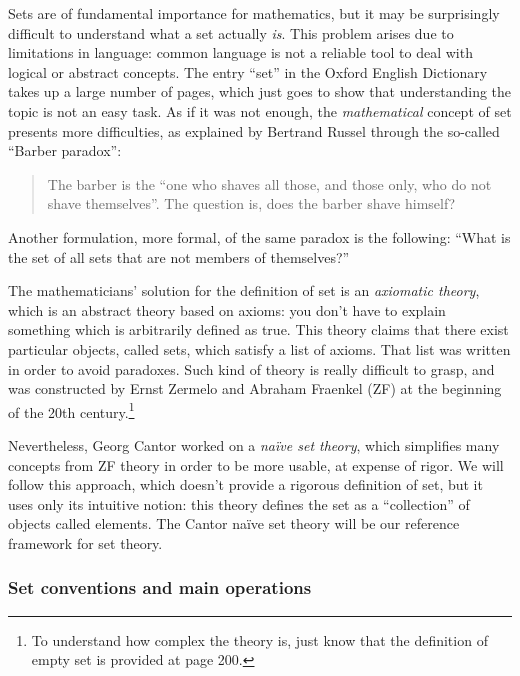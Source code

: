 Sets are of fundamental importance for mathematics, but it may be surprisingly difficult to understand what a set actually \textit{is}. This problem arises due to limitations in language: common language is not a reliable tool to deal with logical or abstract concepts. The entry ``set'' in the Oxford English Dictionary takes up a large number of pages, which just goes to show that understanding the topic is not an easy task. As if it was not enough, the \textit{mathematical} concept of set presents more difficulties, as explained by Bertrand Russel through the so-called ``Barber paradox'': 

\begin{quote}
	The barber is the ``one who shaves all those, and those only, who do not shave themselves''. The question is, does the barber shave himself?
\end{quote}

Another formulation, more formal, of the same paradox is the following: ``What is the set of all sets that are not members of themselves?''

The mathematicians' solution for the definition of set is an \emph{axiomatic theory}, which is an abstract theory based on axioms: you don't have to explain something which is arbitrarily defined as true. This theory claims that there exist particular objects, called sets, which satisfy a list of axioms. That list was written in order to avoid paradoxes. Such kind of theory is really difficult to grasp, and was constructed by Ernst Zermelo and Abraham Fraenkel (ZF) at the beginning of the 20th century.\footnote{To understand how complex the theory is, just know that the definition of empty set is provided at page 200.}

Nevertheless, Georg Cantor worked on a \textit{naïve set theory}, which simplifies many concepts from ZF theory in order to be more usable, at expense of rigor. We will follow this approach, which doesn't provide a rigorous definition of set, but it uses only its intuitive notion: this theory defines the set as a ``collection'' of objects called elements. The Cantor naïve set theory will be our reference framework for set theory.

\subsubsection{Set conventions and main operations}

